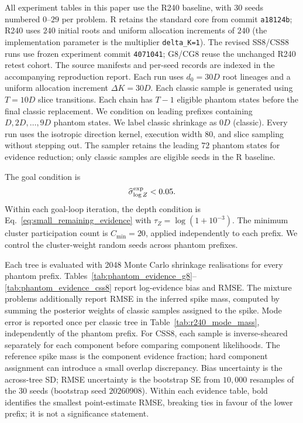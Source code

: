 \documentclass[pdflatex,sn-basic,icol]{sn-jnl}
\theoremstyle{plain}
\theoremstyle{definition}
\begin{document}
All experiment tables in this paper use the R240 baseline, with 30 seeds numbered $0$--$29$ per problem.
R retains the standard core from commit \texttt{a18124b}; R240 uses $240$ initial roots and uniform allocation increments of $240$ (the implementation parameter is the multiplier \texttt{delta\_K=1}).
The revised SS8/CSS8 runs use frozen experiment commit \texttt{4071041}; G8/CG8 reuse the unchanged R240 retest cohort.
The source manifests and per-seed records are indexed in the accompanying reproduction report.
Each run uses $d_0=30D$ root lineages and a uniform allocation increment $\Delta K=30D$.
Each classic sample is generated using $T=10D$ slice transitions.
Each chain has $T-1$ eligible phantom states before the final classic replacement.
We condition on leading prefixes containing $D,2D,\ldots,9D$ phantom states.
We label classic shrinkage as $0D$ (classic).
Every run uses the isotropic direction kernel, execution width $80$, and slice sampling without stepping out.
The sampler retains the leading $72$ phantom states for evidence reduction; only classic samples are eligible seeds in the R baseline.

The goal condition is
\begin{align}
    \widehat\sigma^{\rm exp}_{\log Z}<0.05.
    \label{eq:benchmark_goal}
\end{align}
Within each goal-loop iteration, the depth condition is Eq.~\ref{eq:small_remaining_evidence} with $\tau_Z=\log(1+10^{-3})$.
The minimum cluster participation count is $C_{\min}=20$, applied independently to each prefix.
We control the cluster-weight random seeds across phantom prefixes.

Each tree is evaluated with 2048 Monte Carlo shrinkage realisations for every phantom prefix.
Tables~\ref{tab:phantom_evidence_g8}--\ref{tab:phantom_evidence_css8} report log-evidence bias and RMSE.
The mixture problems additionally report RMSE in the inferred spike mass, computed by summing the posterior weights of classic samples assigned to the spike.
Mode error is reported once per classic tree in Table~\ref{tab:r240_mode_mass}, independently of the phantom prefix.
For CSS8, each sample is inverse-sheared separately for each component before comparing component likelihoods.
The reference spike mass is the component evidence fraction; hard component assignment can introduce a small overlap discrepancy.
Bias uncertainty is the across-tree SD; RMSE uncertainty is the bootstrap SE from $10{,}000$ resamples of the 30 seeds (bootstrap seed $20260908$).
Within each evidence table, bold identifies the smallest point-estimate RMSE, breaking ties in favour of the lower prefix; it is not a significance statement.
\end{document}
